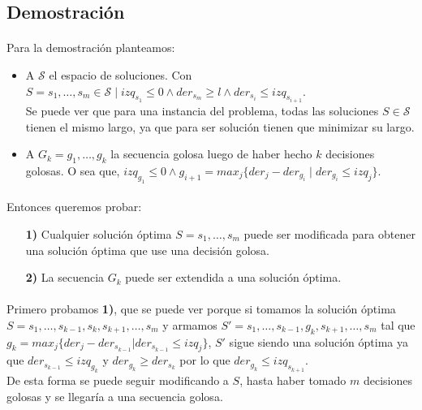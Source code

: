 \documentclass[./main.tex]{subfiles}
\begin{document}
\subsection{Demostración}
\label{sec:ej2-dem}

\paragraph{} Para la demostración planteamos:
\begin{itemize}
  \item A \(\mathcal{S}\) el espacio de soluciones. Con \(S = s_1, \ldots, s_m \in \mathcal{S} \mid izq_{s_1} \leq 0 \land der_{s_m} \geq l \land der_{s_i} \leq izq_{s_{i+1}}\). \\
  Se puede ver que para una instancia del problema, todas las soluciones \(S \in \mathcal{S}\) tienen el mismo largo, ya que para ser solución tienen que minimizar su largo. 
  \item A \(G_k = g_1, \ldots, g_k\) la secuencia golosa luego de haber hecho \(k\) decisiones golosas. O sea que, \(izq_{g_1} \leq 0 \land g_{i+1} = max_j\{der_j - der_{g_i} \mid der_{g_i} \leq izq_j\}\).
\end{itemize}

\paragraph{} Entonces queremos probar: \begin{itemize}
  \item[\textbf{1)}] Cualquier solución óptima \(S = s_1, \ldots, s_m\) puede ser modificada para obtener una solución óptima que use una decisión golosa.
  \item[\textbf{2)}] La secuencia \(G_k\) puede ser extendida a una solución óptima.
\end{itemize}

\paragraph{} Primero probamos \textbf{1)}, que se puede ver porque si tomamos la solución óptima \(S = s_1, \ldots, s_{k-1}, s_k, s_{k+1}, \ldots, s_m\) y armamos \(S' = s_1, \ldots, s_{k-1}, g_k, s_{k+1}, \ldots, s_m\) tal que \(g_k = max_j\{der_j - der_{s_{k-1}} | der_{s_{k-1}} \leq izq_j\}\), \(S'\) sigue siendo una solución óptima ya que \(der_{s_{k-1}} \leq izq_{g_k}\) y \(der_{g_k} \geq der_{s_k}\) por lo que \(der_{g_k} \leq izq_{s_{k+1}}\). \\
De esta forma se puede seguir modificando a \(S\), hasta haber tomado \(m\) decisiones golosas y se llegaría a una secuencia golosa.
\end{document}
